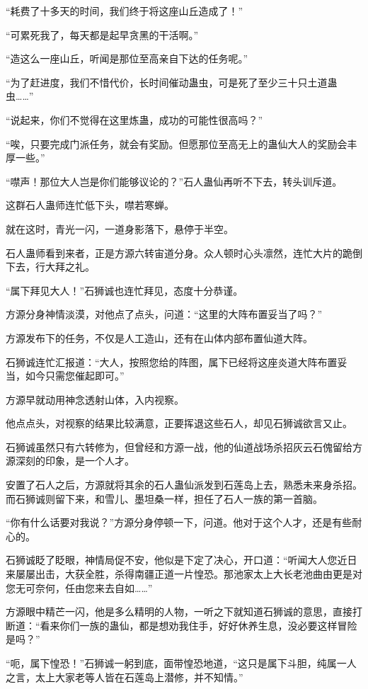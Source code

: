 \begin{this_body}
“耗费了十多天的时间，我们终于将这座山丘造成了！”

“可累死我了，每天都是起早贪黑的干活啊。”

“造这么一座山丘，听闻是那位至高亲自下达的任务呢。”

“为了赶进度，我们不惜代价，长时间催动蛊虫，可是死了至少三十只土道蛊虫……”

“说起来，你们不觉得在这里炼蛊，成功的可能性很高吗？”

“唉，只要完成门派任务，就会有奖励。但愿那位至高无上的蛊仙大人的奖励会丰厚一些。”

“噤声！那位大人岂是你们能够议论的？”石人蛊仙再听不下去，转头训斥道。

这群石人蛊师连忙低下头，噤若寒蝉。

就在这时，青光一闪，一道身影落下，悬停于半空。

石人蛊师看到来者，正是方源六转宙道分身。众人顿时心头凛然，连忙大片的跪倒下去，行大拜之礼。

“属下拜见大人！”石狮诚也连忙拜见，态度十分恭谨。

方源分身神情淡漠，对他点了点头，问道：“这里的大阵布置妥当了吗？”

方源发布下的任务，不仅是人工造山，还有在山体内部布置仙道大阵。

石狮诚连忙汇报道：“大人，按照您给的阵图，属下已经将这座炎道大阵布置妥当，如今只需您催起即可。”

方源早就动用神念透射山体，入内视察。

他点点头，对视察的结果比较满意，正要挥退这些石人，却见石狮诚欲言又止。

石狮诚虽然只有六转修为，但曾经和方源一战，他的仙道战场杀招灰云石傀留给方源深刻的印象，是一个人才。

安置了石人之后，方源就将其余的石人蛊仙派发到石莲岛上去，熟悉未来身杀招。而石狮诚则留下来，和雪儿、墨坦桑一样，担任了石人一族的第一首脑。

“你有什么话要对我说？”方源分身停顿一下，问道。他对于这个人才，还是有些耐心的。

石狮诚眨了眨眼，神情局促不安，他似是下定了决心，开口道：“听闻大人您近日来屡屡出击，大获全胜，杀得南疆正道一片惶恐。那池家太上大长老池曲由更是对您无可奈何，任由您来去自如……”

方源眼中精芒一闪，他是多么精明的人物，一听之下就知道石狮诚的意思，直接打断道：“看来你们一族的蛊仙，都是想劝我住手，好好休养生息，没必要这样冒险是吗？”

“呃，属下惶恐！”石狮诚一躬到底，面带惶恐地道，“这只是属下斗胆，纯属一人之言，太上大家老等人皆在石莲岛上潜修，并不知情。”


\end{this_body}
